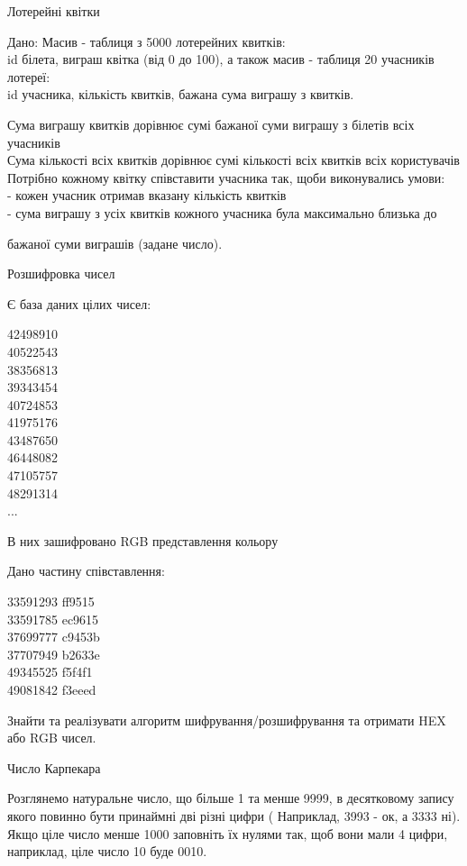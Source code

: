 \documentclass[]{article}
\begin{document}
\begin{enumerate}
Лотерейні квітки

Дано: Масив - таблиця з 5000 лотерейних квитків:\\
id білета, виграш квітка (від 0 до 100), а також масив - таблиця 20
учасників лотереї:\\
id учасника, кількість квитків, бажана сума виграшу з квитків.

Сума виграшу квитків дорівнює сумі бажаної суми виграшу з білетів всіх
учасників\\
Сума кількості всіх квитків дорівнює сумі кількості всіх квитків всіх
користувачів Потрібно кожному квітку співставити учасника так, щоби
виконувались умови:\\
- кожен учасник отримав вказану кількість квитків\\
- сума виграшу з усіх квитків кожного учасника була максимально близька
до

бажаної суми виграшів (задане число).

Розшифровка чисел

Є база даних цілих чисел:

42498910\\
40522543\\
38356813\\
39343454\\
40724853\\
41975176\\
43487650\\
46448082\\
47105757\\
48291314\\
...

В них зашифровано RGB представлення кольору

Дано частину співставлення:

33591293 ff9515\\
33591785 ec9615\\
37699777 c9453b\\
37707949 b2633e\\
49345525 f5f4f1\\
49081842 f3eeed

Знайти та реалізувати алгоритм шифрування/розшифрування та отримати HEX
або RGB чисел.

Число Карпекара

Розглянемо натуральне число, що більше 1 та менше 9999, в десятковому
запису якого повинно бути принаймні дві різні цифри ( Наприклад, 3993 -
ок, а 3333 ні). Якщо ціле число менше 1000 заповніть їх нулями так, щоб
вони мали 4 цифри, наприклад, ціле число 10 буде 0010.


\end{enumerate}
\end{document}
